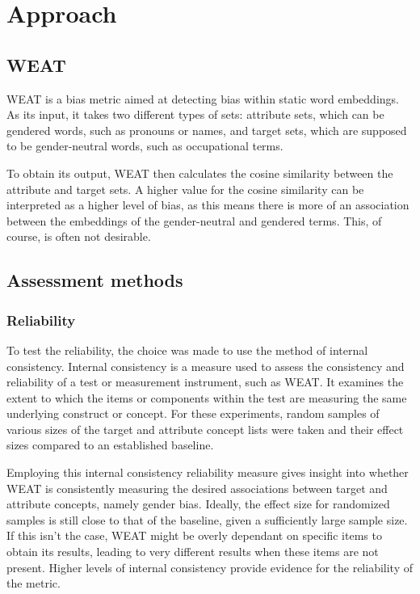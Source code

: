 \documentclass[11pt]{article}
\begin{document}
\section{Approach}
\subsection{WEAT}
WEAT is a bias metric aimed at detecting bias within static word embeddings. As its input, it takes two different types of sets: attribute sets, which can be gendered words, such as pronouns or names, and target sets, which are supposed to be gender-neutral words, such as occupational terms. 

To obtain its output, WEAT then calculates the cosine similarity between the attribute and target sets. A higher value for the cosine similarity can be interpreted as a higher level of bias, as this means there is more of an association between the embeddings of the gender-neutral and gendered terms. This, of course, is often not desirable.

\subsection{Assessment methods}
\subsubsection{Reliability}
To test the reliability, the choice was made to use the method of internal consistency. Internal consistency is a measure used to assess the consistency and reliability of a test or measurement instrument, such as WEAT. It examines the extent to which the items or components within the test are measuring the same underlying construct or concept. For these experiments, random samples of various sizes of the target and attribute concept lists were taken and their effect sizes compared to an established baseline.

Employing this internal consistency reliability measure gives insight into whether WEAT is consistently measuring the desired associations between target and attribute concepts, namely gender bias. Ideally, the effect size for randomized samples is still close to that of the baseline, given a sufficiently large sample size. If this isn't the case, WEAT might be overly dependant on specific items to obtain its results, leading to very different results when these items are not present. Higher levels of internal consistency provide evidence for the reliability of the metric.
\end{document}
